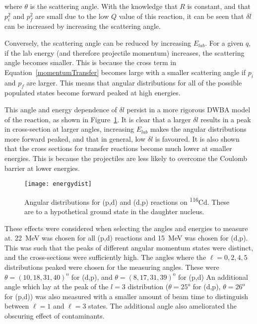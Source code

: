 where $\theta$ is the scattering angle. With the knowledge that $R$ is constant, and that $p_i^2$ and $p_f^2$ are small due to the low $Q$ value of this reaction, it can be seen that $\delta l$ can be increased by increasing the scattering angle.

Conversely, the scattering angle can be reduced by increasing $E_{lab}$. For a given $q$, if the lab energy (and therefore projectile momentum) increases, the scattering angle becomes smaller. This is because the cross term in Equation~\ref{momentumTransfer} becomes large with a smaller scattering angle if $p_i$ and $p_f$ are larger. This means that angular distributions for all of the possible populated states become forward peaked at high energies.

This angle and energy dependence of $\delta l$ persist in a more rigorous DWBA model of the reaction, as shown in Figure~\ref{energyDists}. It is clear that a larger $\delta l$ results in a peak in cross-section at larger angles, increasing $E_{lab}$ makes the angular distributions more forward peaked, and that in general, low $\delta l$ is favoured. It is also shown that the cross sections for transfer reactions become much lower at smaller energies. This is because the projectiles are less likely to overcome the Coulomb barrier at lower energies.

\begin{figure}[h]	
\hspace*{-0.5cm}
\begin{center}
	\texttt{[image: energydist]}
\end{center}
			\caption[Angular distributions for (p,d) and (d,p) at different lab energies]{Angular distributions for (p,d) and (d,p) reactions on \textsuperscript{116}Cd. These are to a hypothetical ground state in the daughter nucleus.}
		\label{energyDists}
\end{figure}
\FloatBarrier

These effects were considered when selecting the angles and energies to measure at. \SI{22}{\mega\electronvolt} was chosen for all (p,d) reactions and \SI{15}{\mega\electronvolt} was chosen for (d,p). This was such that the peaks of different angular momentum states were distinct, and the cross-sections were sufficiently high. The angles where the $\ell = 0,2,4,5$ distributions peaked were chosen for the measuring angles. These were $\theta = (10, 18, 31, 40)^\mathrm{o}$ for (d,p), and $\theta = (8, 17, 31, 39)^\mathrm{o}$ for (p,d) An additional angle which lay at the peak of the $l = 3$ distribution ($\theta = 25^\mathrm{o}$ for (d,p), $\theta = 26^\mathrm{o}$ for (p,d)) was also measured with a smaller amount of beam time to distinguish between $\ell = 1$ and $\ell = 3$ states. The additional angle also ameliorated the obscuring effect of contaminants.

